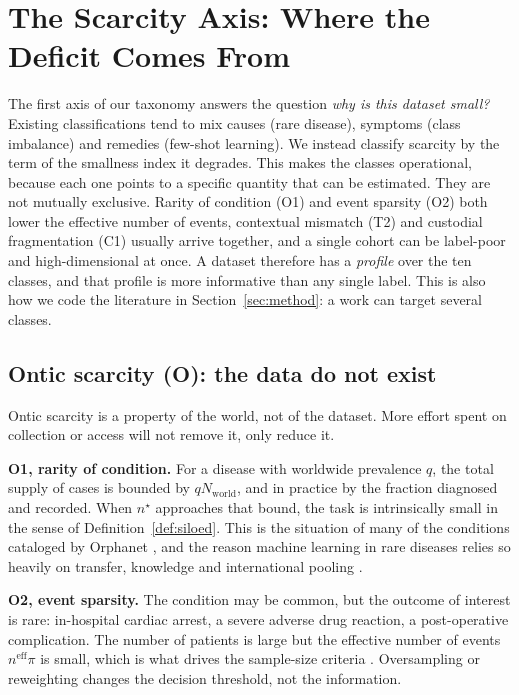 \documentclass[acmsmall,screen,review]{acmart}
\newcommand{\eff}{\mathrm{eff}}
\theoremstyle{acmdefinition}
\begin{document}
\section{The Scarcity Axis: Where the Deficit Comes From}\label{sec:scarcity}

The first axis of our taxonomy answers the question \emph{why is this dataset small?} Existing classifications tend to mix causes (rare disease), symptoms (class imbalance) and remedies (few-shot learning). We instead classify scarcity by the term of the smallness index it degrades. This makes the classes operational, because each one points to a specific quantity that can be estimated. They are not mutually exclusive. Rarity of condition (O1) and event sparsity (O2) both lower the effective number of events, contextual mismatch (T2) and custodial fragmentation (C1) usually arrive together, and a single cohort can be label-poor and high-dimensional at once. A dataset therefore has a \emph{profile} over the ten classes, and that profile is more informative than any single label. This is also how we code the literature in Section~\ref{sec:method}: a work can target several classes.

\subsection{Ontic scarcity (O): the data do not exist}

Ontic scarcity is a property of the world, not of the dataset. More effort spent on collection or access will not remove it, only reduce it.

\textbf{O1, rarity of condition.} For a disease with worldwide prevalence $q$, the total supply of cases is bounded by $qN_{\mathrm{world}}$, and in practice by the fraction diagnosed and recorded. When $n^{\star}$ approaches that bound, the task is intrinsically small in the sense of Definition~\ref{def:siloed}. This is the situation of many of the conditions cataloged by Orphanet \cite{nguengangwakap2020estimating}, and the reason machine learning in rare diseases relies so heavily on transfer, knowledge and international pooling \cite{banerjee2023machine,schaefer2020use}.

\textbf{O2, event sparsity.} The condition may be common, but the outcome of interest is rare: in-hospital cardiac arrest, a severe adverse drug reaction, a post-operative complication. The number of patients is large but the effective number of events $n^{\eff}\pi$ is small, which is what drives the sample-size criteria \cite{peduzzi1996simulation,riley2019minimumsample}. Oversampling or reweighting changes the decision threshold, not the information.
\end{document}

